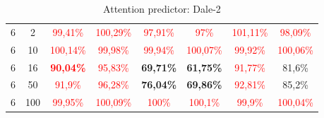 \begin{table}[ht]
\begin{tabular}{cc|c|c|c|c|c|c}
        {6} & {2}   & \textcolor{red}{99,41\%}          & \textcolor{red}{100,29\%}         & \textcolor{red}{97,91\%} & \textcolor{red}{97\%}     & \textcolor{red}{101,11\%} & \textcolor{red}{98,09\%}  \\
        {6} & {10}  & \textcolor{red}{100,14\%}         & \textcolor{red}{99,98\%}          & \textcolor{red}{99,94\%} & \textcolor{red}{100,07\%} & \textcolor{red}{99,92\%}  & \textcolor{red}{100,06\%} \\
        {6} & {16}  & \textcolor{red}{\textbf{90,04\%}} & \textcolor{red}{95,83\%}          & \textbf{69,71\%}         & \textbf{61,75\%}          & \textcolor{red}{91,77\%}  & {81,6\%}                  \\
        {6} & {50}  & \textcolor{red}{91,9\%}           & \textcolor{red}{96,28\%}          & \textbf{76,04\%}         & \textbf{69,86\%}          & \textcolor{red}{92,81\%}  & {85,2\%}                  \\
        {6} & {100} & \textcolor{red}{99,95\%}          & \textcolor{red}{100,09\%}         & \textcolor{red}{100\%}   & \textcolor{red}{100,1\%}  & \textcolor{red}{99,9\%}   & \textcolor{red}{100,04\%} \\
        \bottomrule
    \end{tabular}
    \caption{Attention predictor: Dale-2}
    \label{TODO: label}
\end{table}


